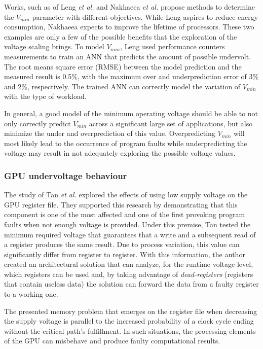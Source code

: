 Works, such as of Leng \textit{et al.} \cite{leng_safe_2015} and Nakhaeea  \textit{et al.} \cite{nakhaee_lifetime_2018} propose methods to determine the $V_{min}$ parameter with different objectives. While Leng aspires to reduce energy consumption, Nakhaeea expects to improve the lifetime of processors. These two examples are only a few of the possible benefits that the exploration of the voltage scaling brings. To model $V_{min}$, Leng used performance counters measurements to train an ANN that predicts the amount of possible undervolt. The root means square error (RMSE) between the model prediction and the measured result is 0.5\%, with the maximum over and underprediction error of 3\% and 2\%, respectively. The trained ANN can correctly model the variation of $V_{min}$ with the type of workload.

In general, a good model of the minimum operating voltage should be able to not only correctly predict  $V_{min}$ across a significant large set of applications, but also minimize the under and overprediction of this value. Overpredicting $V_{min}$ will most likely lead to the occurrence of program faults while underpredicting the voltage may result in not adequately exploring the possible voltage values.

\subsubsection{GPU undervoltage behaviour}

The study of Tan \textit{et al.} \cite{tan_combating_2016} explored the effects of using low supply voltage on the GPU register file. They supported this research by demonstrating that this component is one of the most affected and one of the first provoking program faults when not enough voltage is provided. Under this premise, Tan tested the minimum required voltage that guarantees that a write and a subsequent read of a register produces the same result. Due to process variation, this value can significantly differ from register to register. With this information, the author created an architectural solution that can analyze, for the runtime voltage level, which registers can be used and, by taking advantage of \textit{dead-registers} (registers that contain useless data) the solution can forward the data from a faulty register to a working one.

The presented memory problem that emerges on the register file when decreasing the supply voltage is parallel to the increased probability of a clock cycle ending without the critical path's fulfillment. In such situations, the processing elements of the GPU can misbehave and produce faulty computational results.



